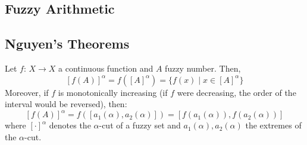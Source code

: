 \begin{definition}[Convexity]
    
\end{definition}

\begin{definition}
    
\end{definition}

\begin{definition}
    
\end{definition}

\subsection{Fuzzy Arithmetic}


\subsection{Nguyen's Theorems}
\begin{theorem}
    Let $f:\, X \longrightarrow X$ a continuous function and $A$  fuzzy number. Then,
    \[
    [f(A)]^{\alpha} = f([A]^{\alpha})=\{f(x)\mid x\in [A]^\alpha\}
    \]
    Moreover, if $f$ is monotonically increasing (if $f$ were decreasing, the order of the interval would be reversed), then:
    \[
    [f(A)]^{\alpha} = f([a_1(\alpha), a_2(\alpha)])=
    [f(a_1(\alpha)), f(a_2(\alpha))]
    \]
    where $[\cdot]^\alpha$ denotes the $\alpha$-cut of a fuzzy set and $a_1(\alpha), a_2(\alpha)$ the extremes of the $\alpha$-cut.
\end{theorem}


